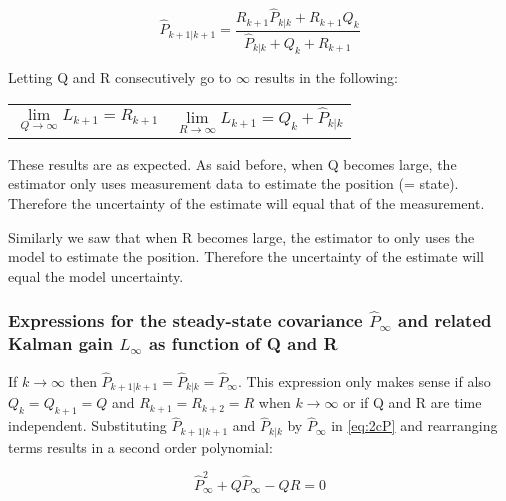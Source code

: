 \documentclass[a4paper]{article}
\newcommand{\newpar}{\vspace{.3cm}\noindent}
\begin{document}
\begin{equation}
    \hat{P}_{k+1|k+1} = \frac{R_{k+1}\hat{P}_{k|k} + R_{k+1}Q_{k}}{\hat{P}_{k|k} + Q_{k} + R_{k+1}}
    \label{eq:2cP}
\end{equation}

\newpar
Letting Q and R consecutively go to \(\infty\) results in the following:

\begin{center}
    \begin{tabular}{p{6cm}p{6cm}}
        \begin{equation}
            \lim_{Q\to\infty} L_{k+1} = R_{k+1}
            \label{eq:PQinf}
        \end{equation}
        &  
        \begin{equation}
            \lim_{R\to\infty} L_{k+1} = Q_{k} + \hat{P}_{k|k}
            \label{eq:PRinf}
        \end{equation}
        
    \end{tabular}
\end{center}

\newpar
These results are as expected. As said before, when Q becomes large, the estimator only uses measurement data to estimate the position (= state). Therefore the uncertainty of the estimate will equal that of the measurement.

\newpar
Similarly we saw that when R becomes large, the estimator to only uses the model to estimate the position. Therefore the uncertainty of the estimate will equal the model uncertainty.

\subsubsection{Expressions for the steady-state covariance \(\hat{P}_{\infty}\) and related Kalman gain \(L_{\infty}\) as function of Q and R}

If \(k\to\infty\) then \(\hat{P}_{k+1|k+1} = \hat{P}_{k|k} = \hat{P}_{\infty}\). This expression only makes sense if also  \(Q_{k} = Q_{k+1} = Q\) and \(R_{k+1} = R_{k+2} = R\) when \(k\to\infty\) or if Q and R are time independent. Substituting \(\hat{P}_{k+1|k+1}\) and \(\hat{P}_{k|k}\) by \(\hat{P}_{\infty}\) in \autoref{eq:2cP} and rearranging terms results in a second order polynomial:

\begin{equation}
    \hat{P}_{\infty}^2 + Q\hat{P}_{\infty} - QR = 0
\end{equation}
\end{document}
